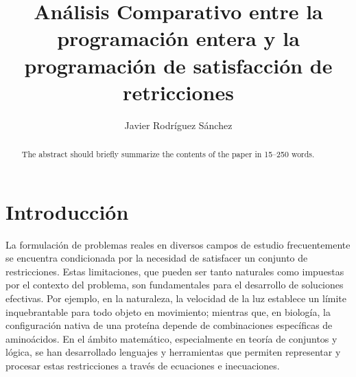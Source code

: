 \documentclass[runningheads]{llncs}
\begin{document}
%
\title{An\'alisis Comparativo entre la programación entera y la programación de satisfacción de retricciones}

%
\author{Javier Rodríguez Sánchez}
%
%
%
\maketitle 
\begin{abstract}
The abstract should briefly summarize the contents of the paper in
15--250 words.
\end{abstract}
%


\section{Introducción}

La formulación de problemas reales en diversos campos de estudio frecuentemente se encuentra condicionada por la necesidad de satisfacer un conjunto de restricciones. Estas limitaciones, que pueden ser tanto naturales como impuestas por el contexto del problema, son fundamentales para el desarrollo de soluciones efectivas. Por ejemplo, en la naturaleza, la velocidad de la luz establece un límite inquebrantable para todo objeto en movimiento; mientras que, en biología, la configuración nativa de una proteína depende de combinaciones específicas de aminoácidos. En el ámbito matemático, especialmente en teoría de conjuntos y lógica, se han desarrollado lenguajes y herramientas que permiten representar y procesar estas restricciones a través de ecuaciones e inecuaciones. \\
\end{document}
